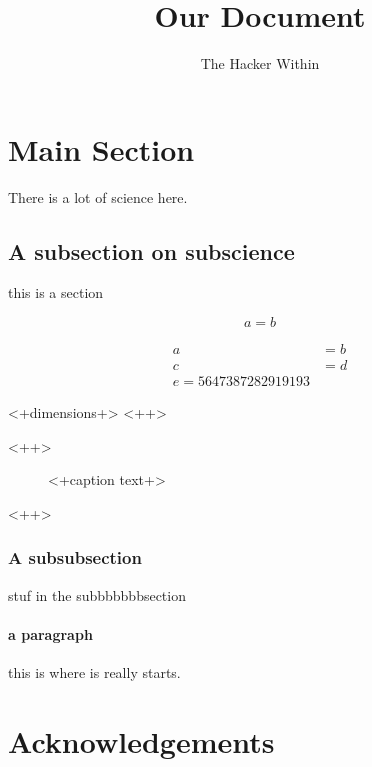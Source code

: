 \documentclass[11pt]{article}
\author{The Hacker Within}
\title{Our Document}
\begin{document}
\maketitle


\section{Main Section}
There is a lot of science here.

\subsection{A subsection on subscience}

this is a section

\begin{equation}
a=b
\end{equation}


\begin{align}
a&=b\\
c&=d\\
e=5647387282919193&
\end{align}

\begin{table}
\centering
\begin{tabular}{<+dimensions+>}
<++>
\end{tabular}
\caption{<+Caption text+>}
\label{tab:<+label+>}
\end{table}<++>

\begin{figure}[<+htpb+>]
\begin{center}
\end{center}
\caption{<+caption text+>}
\label{fig:<+label+>}
\end{figure}<++>
\FloatBarrier


\subsubsection{A subsubsection}
stuf in the subbbbbbbsection

\paragraph{a paragraph}
this is where is really starts.




\section{Acknowledgements}

\end{document}
